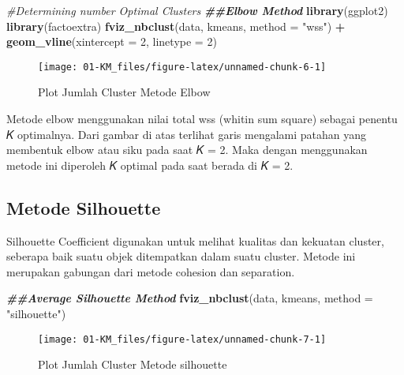\documentclass[
]{elegantbook}
\newenvironment{Shaded}{\begin{snugshade}}{\end{snugshade}}
\newcommand{\AttributeTok}[1]{\textcolor[rgb]{0.13,0.29,0.53}{#1}}
\newcommand{\CommentTok}[1]{\textcolor[rgb]{0.56,0.35,0.01}{\textit{#1}}}
\newcommand{\DecValTok}[1]{\textcolor[rgb]{0.00,0.00,0.81}{#1}}
\newcommand{\DocumentationTok}[1]{\textcolor[rgb]{0.56,0.35,0.01}{\textbf{\textit{#1}}}}
\newcommand{\FunctionTok}[1]{\textcolor[rgb]{0.13,0.29,0.53}{\textbf{#1}}}
\newcommand{\NormalTok}[1]{#1}
\newcommand{\SpecialCharTok}[1]{\textcolor[rgb]{0.81,0.36,0.00}{\textbf{#1}}}
\newcommand{\StringTok}[1]{\textcolor[rgb]{0.31,0.60,0.02}{#1}}
\begin{document}
\begin{Shaded}
\begin{Highlighting}[]
\CommentTok{\#Determining number Optimal Clusters}
\DocumentationTok{\#\#Elbow Method}
\FunctionTok{library}\NormalTok{(ggplot2)}
\FunctionTok{library}\NormalTok{(factoextra)}
\FunctionTok{fviz\_nbclust}\NormalTok{(data, kmeans, }\AttributeTok{method =} \StringTok{"wss"}\NormalTok{) }\SpecialCharTok{+}
  \FunctionTok{geom\_vline}\NormalTok{(}\AttributeTok{xintercept =} \DecValTok{2}\NormalTok{, }\AttributeTok{linetype =} \DecValTok{2}\NormalTok{)}
\end{Highlighting}
\end{Shaded}

\begin{figure}

{\centering \texttt{[image: 01-KM\_files/figure-latex/unnamed-chunk-6-1]} 

}

\caption{Plot Jumlah Cluster Metode Elbow}\label{fig:unnamed-chunk-6}
\end{figure}

Metode elbow menggunakan nilai total wss (whitin sum square) sebagai penentu 𝐾 optimalnya. Dari gambar di atas terlihat garis mengalami patahan yang membentuk elbow atau siku pada saat 𝐾 = 2. Maka dengan menggunakan metode ini diperoleh 𝐾 optimal pada saat berada di 𝐾 = 2.

\hypertarget{metode-silhouette}{%
\subsection{Metode Silhouette}\label{metode-silhouette}}

Silhouette Coefficient digunakan untuk melihat kualitas dan kekuatan cluster, seberapa baik suatu objek ditempatkan dalam suatu cluster. Metode ini merupakan gabungan dari metode cohesion dan separation.

\begin{Shaded}
\begin{Highlighting}[]
\DocumentationTok{\#\#Average Silhouette Method}
\FunctionTok{fviz\_nbclust}\NormalTok{(data, kmeans, }\AttributeTok{method =} \StringTok{"silhouette"}\NormalTok{)}
\end{Highlighting}
\end{Shaded}

\begin{figure}

{\centering \texttt{[image: 01-KM\_files/figure-latex/unnamed-chunk-7-1]} 

}

\caption{Plot Jumlah Cluster Metode silhouette}\label{fig:unnamed-chunk-7}
\end{figure}
\end{document}
